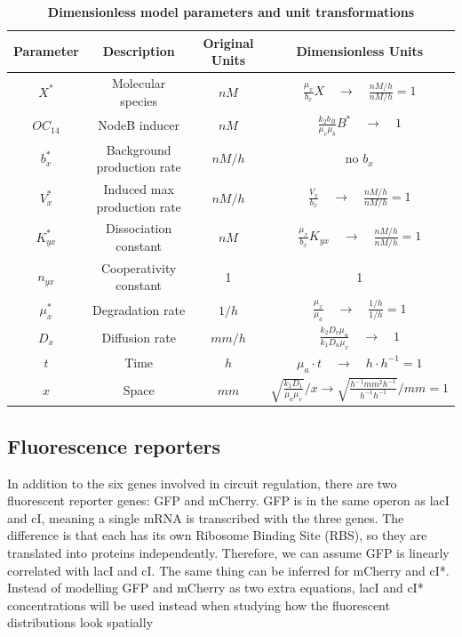 \begin{table}[H]
    \centering
    \caption{\textbf{Dimensionless model parameters and unit transformations}}
    \label{tab:Dimensionless_params}
    \renewcommand{\arraystretch}{2.3} %
    \begin{tabular}{|c|c|c|c|}
        \hline
        \textbf{Parameter} & \textbf{Description} & \textbf{Original Units} & \textbf{Dimensionless Units} \\
        \hline
        $X^*$ & Molecular species & $nM$ & $\frac{\mu_{x}}{b_{x}}X \quad \rightarrow \quad  \frac{nM/h}{nM/h}  = 1$
        \\
        \hline

        $OC_{14}$ & NodeB inducer & $nM$ & $\frac{k_{2} b_{B}}{\mu_{v} \mu_{b}} B^* \quad \rightarrow \quad  1$
        \\
        \hline
        $b_{x}^*$ & Background production rate & $nM/h$ & no $b_{x} $\\
        \hline
        $ V_{x}^*$  & Induced max production rate & $nM/h$ & $ \frac{V_{x}}{b_{x}} \quad \rightarrow \quad  \frac{nM/h}{nM/h} = 1 $\\
        \hline
        $K_{yx}^*$ & Dissociation constant & $nM$ & $ \frac{\mu_{x}}{b_{x}} K_{yx} \quad \rightarrow \quad \frac{nM/h}{nM/h} = 1 $\\
        \hline
        $ n_{yx}$  & Cooperativity constant & 1 & 1\\
        \hline
        $ \mu_{x}^* $ & Degradation rate & $1/h$ & $\frac{\mu_{x}}{\mu_{a}} \quad \rightarrow \quad  \frac{1/h}{1/h}=1 $\\
        \hline
        $D_{x}$ & Diffusion rate & $mm/h$ & $ \frac{k_{2} D_{v} \mu_{u}}{k_{1} D_{u} \mu_{v}} \quad \rightarrow \quad  1$  \\
        \hline
        $ t $ & Time & $h$ & $\mu_{a} \cdot t \quad \rightarrow \quad  h \cdot  h^{-1} =1$\\
        \hline
        $ x$  & Space & $mm$ & $\sqrt{\frac{k_{1} D_{1}}{\mu_{a}\mu_{v}}}/x \rightarrow  \sqrt{\frac{h^{-1} mm^{2} h^{-1}}{h^{-1}h^{-1}}}/mm  = 1$ \\
        \hline
    \end{tabular}
\end{table}

\subsection{Fluorescence reporters}
In addition to the six genes involved in circuit regulation, there are two fluorescent reporter genes: GFP and mCherry.
GFP is in the same operon as lacI and cI, meaning a single mRNA is transcribed with the three genes.
The difference is that each has its own Ribosome Binding Site (RBS),
so they are translated into proteins independently.
Therefore, we can assume GFP is linearly correlated with lacI and cI.
The same thing can be inferred for mCherry and cI*.
Instead of modelling GFP and mCherry as two extra equations,
lacI and cI* concentrations will be used instead when studying how the fluorescent distributions look spatially

